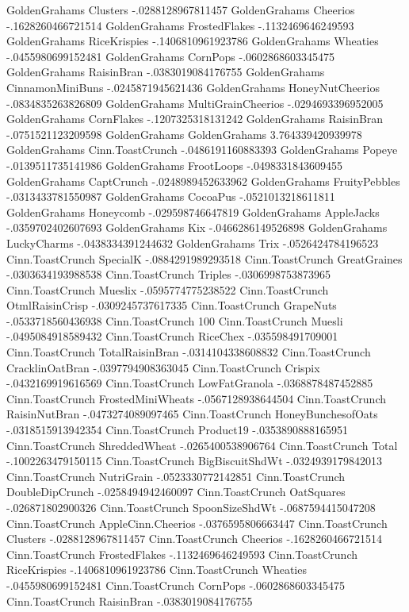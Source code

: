GoldenGrahams	Clusters	-.0288128967811457
GoldenGrahams	Cheerios	-.1628260466721514
GoldenGrahams	FrostedFlakes	-.1132469646249593
GoldenGrahams	RiceKrispies	-.1406810961923786
GoldenGrahams	Wheaties	-.0455980699152481
GoldenGrahams	CornPops	-.0602868603345475
GoldenGrahams	RaisinBran	-.0383019084176755
GoldenGrahams	CinnamonMiniBuns	-.0245871945621436
GoldenGrahams	HoneyNutCheerios	-.0834835263826809
GoldenGrahams	MultiGrainCheerios	-.0294693396952005
GoldenGrahams	CornFlakes	-.1207325318131242
GoldenGrahams	RaisinBran	-.0751521123209598
GoldenGrahams	GoldenGrahams	3.764339420939978
GoldenGrahams	Cinn.ToastCrunch	-.0486191160883393
GoldenGrahams	Popeye	-.0139511735141986
GoldenGrahams	FrootLoops	-.0498331843609455
GoldenGrahams	CaptCrunch	-.0248989452633962
GoldenGrahams	FruityPebbles	-.0313433781550987
GoldenGrahams	CocoaPus	-.0521013218611811
GoldenGrahams	Honeycomb	-.029598746647819
GoldenGrahams	AppleJacks	-.0359702402607693
GoldenGrahams	Kix	-.0466286149526898
GoldenGrahams	LuckyCharms	-.0438334391244632
GoldenGrahams	Trix	-.0526424784196523
Cinn.ToastCrunch	SpecialK	-.0884291989293518
Cinn.ToastCrunch	GreatGraines	-.0303634193988538
Cinn.ToastCrunch	Triples	-.0306998753873965
Cinn.ToastCrunch	Mueslix	-.0595774775238522
Cinn.ToastCrunch	OtmlRaisinCrisp	-.0309245737617335
Cinn.ToastCrunch	GrapeNuts	-.0533718560436938
Cinn.ToastCrunch	100%
Cinn.ToastCrunch	Muesli	-.0495084918589432
Cinn.ToastCrunch	RiceChex	-.035598491709001
Cinn.ToastCrunch	TotalRaisinBran	-.0314104338608832
Cinn.ToastCrunch	CracklinOatBran	-.0397794908363045
Cinn.ToastCrunch	Crispix	-.0432169919616569
Cinn.ToastCrunch	LowFatGranola	-.0368878487452885
Cinn.ToastCrunch	FrostedMiniWheats	-.0567128938644504
Cinn.ToastCrunch	RaisinNutBran	-.0473274089097465
Cinn.ToastCrunch	HoneyBunchesofOats	-.0318515913942354
Cinn.ToastCrunch	Product19	-.0353890888165951
Cinn.ToastCrunch	ShreddedWheat	-.0265400538906764
Cinn.ToastCrunch	Total	-.1002263479150115
Cinn.ToastCrunch	BigBiscuitShdWt	-.0324939179842013
Cinn.ToastCrunch	NutriGrain	-.0523330772142851
Cinn.ToastCrunch	DoubleDipCrunch	-.0258494942460097
Cinn.ToastCrunch	OatSquares	-.026871802900326
Cinn.ToastCrunch	SpoonSizeShdWt	-.0687594415047208
Cinn.ToastCrunch	AppleCinn.Cheerios	-.0376595806663447
Cinn.ToastCrunch	Clusters	-.0288128967811457
Cinn.ToastCrunch	Cheerios	-.1628260466721514
Cinn.ToastCrunch	FrostedFlakes	-.1132469646249593
Cinn.ToastCrunch	RiceKrispies	-.1406810961923786
Cinn.ToastCrunch	Wheaties	-.0455980699152481
Cinn.ToastCrunch	CornPops	-.0602868603345475
Cinn.ToastCrunch	RaisinBran	-.0383019084176755
